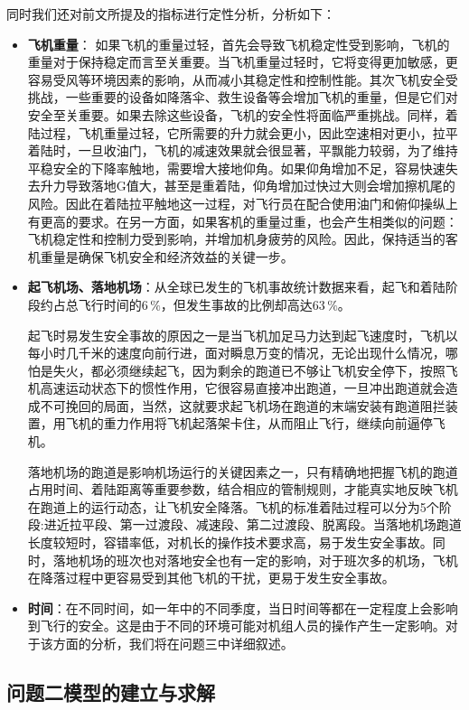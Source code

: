 \documentclass{MathorCupModeling}
\begin{document}
	同时我们还对前文所提及的指标进行定性分析，分析如下：
	\begin{itemize}
		\item \textbf{飞机重量}： 如果飞机的重量过轻，首先会导致飞机稳定性受到影响，飞机的重量对于保持稳定而言至关重要。当飞机重量过轻时，它将变得更加敏感，更容易受风等环境因素的影响，从而减小其稳定性和控制性能。其次飞机安全受挑战，一些重要的设备如降落伞、救生设备等会增加飞机的重量，但是它们对安全至关重要。如果去除这些设备，飞机的安全性将面临严重挑战。同样，着陆过程，飞机重量过轻，它所需要的升力就会更小，因此空速相对更小，拉平着陆时，一旦收油门，飞机的减速效果就会很显著，平飘能力较弱，为了维持平稳安全的下降率触地，需要增大接地仰角。如果仰角增加不足，容易快速失去升力导致落地G值大，甚至是重着陆，仰角增加过快过大则会增加擦机尾的风险。因此在着陆拉平触地这一过程，对飞行员在配合使用油门和俯仰操纵上有更高的要求。在另一方面，如果客机的重量过重，也会产生相类似的问题：飞机稳定性和控制力受到影响，并增加机身疲劳的风险。因此，保持适当的客机重量是确保飞机安全和经济效益的关键一步。
		\item \textbf{起飞机场、落地机场}：从全球已发生的飞机事故统计数据来看，起飞和着陆阶段约占总飞行时间的$6\,\%$，但发生事故的比例却高达$63\,\%$。
		
		起飞时易发生安全事故的原因之一是当飞机加足马力达到起飞速度时，飞机以每小时几千米的速度向前行进，面对瞬息万变的情况，无论出现什么情况，哪怕是失火，都必须继续起飞，因为剩余的跑道已不够让飞机安全停下，按照飞机高速运动状态下的惯性作用，它很容易直接冲出跑道，一旦冲出跑道就会造成不可挽回的局面，当然，这就要求起飞机场在跑道的末端安装有跑道阻拦装置，用飞机的重力作用将飞机起落架卡住，从而阻止飞行，继续向前逼停飞机。

		落地机场的跑道是影响机场运行的关键因素之一，只有精确地把握飞机的跑道占用时间、着陆距离等重要参数，结合相应的管制规则，才能真实地反映飞机在跑道上的运行动态，让飞机安全降落。飞机的标准着陆过程可以分为5个阶段:进近拉平段、第一过渡段、减速段、第二过渡段、脱离段。当落地机场跑道长度较短时，容错率低，对机长的操作技术要求高，易于发生安全事故。同时，落地机场的班次也对落地安全也有一定的影响，对于班次多的机场，飞机在降落过程中更容易受到其他飞机的干扰，更易于发生安全事故。
		\item \textbf{时间}：在不同时间，如一年中的不同季度，当日时间等都在一定程度上会影响到飞行的安全。这是由于不同的环境可能对机组人员的操作产生一定影响。对于该方面的分析，我们将在问题三中详细叙述。
	\end{itemize}
	\subsection{问题二模型的建立与求解}
\end{document}
